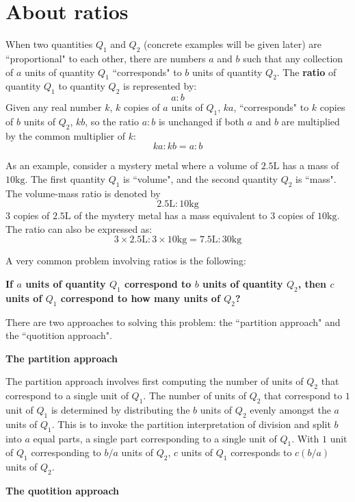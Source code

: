 \documentclass{article}
\begin{document}
\section*{About ratios}

When two quantities \(Q_1\) and \(Q_2\) (concrete examples will be given later) are ``proportional" to each other, there are numbers \(a\) and \(b\) such that any collection of \(a\) units of quantity \(Q_1\) ``corresponds" to \(b\) units of quantity \(Q_2\). The {\bf ratio} of quantity \(Q_1\) to quantity \(Q_2\) is represented by:
\[a : b\]
Given any real number \(k\), \(k\) copies of \(a\) units of \(Q_1\), \(ka\), ``corresponds" to \(k\) copies of \(b\) units of \(Q_2\), \(kb\), so the ratio \(a : b\) is unchanged if both \(a\) and \(b\) are multiplied by the common multiplier of \(k\):
\[ka : kb = a : b\]

As an example, consider a mystery metal where a volume of \(2.5\text{L}\) has a mass of \(10\text{kg}\). The first quantity \(Q_1\) is ``volume", and the second quantity \(Q_2\) is ``mass". The volume-mass ratio is denoted by 
\[2.5\text{L} : 10\text{kg}\]
\(3\) copies of \(2.5\text{L}\) of the mystery metal has a mass equivalent to \(3\) copies of \(10\text{kg}\). The ratio can also be expressed as:
\[3 \times 2.5\text{L} : 3 \times 10\text{kg} = 7.5\text{L} : 30\text{kg}\]

A very common problem involving ratios is the following:

{\bf If \(a\) units of quantity \(Q_1\) correspond to \(b\) units of quantity \(Q_2\), then \(c\) units of \(Q_1\) correspond to how many units of \(Q_2\)?}

There are two approaches to solving this problem: the ``partition approach" and the ``quotition approach".

{\bf The partition approach}

The partition approach involves first computing the number of units of \(Q_2\) that correspond to a single unit of \(Q_1\). The number of units of \(Q_2\) that correspond to \(1\) unit of \(Q_1\) is determined by distributing the \(b\) units of \(Q_2\) evenly amongst the \(a\) units of \(Q_1\). This is to invoke the partition interpretation of division and split \(b\) into \(a\) equal parts, a single part corresponding to a single unit of \(Q_1\). With \(1\) unit of \(Q_1\) corresponding to \(b/a\) units of \(Q_2\), \(c\) units of \(Q_1\) corresponds to \(c(b/a)\) units of \(Q_2\).

{\bf The quotition approach}
\end{document}
